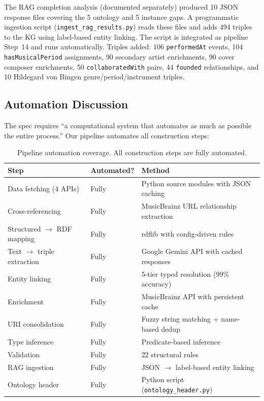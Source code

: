 \documentclass[11pt,a4paper]{article}
\begin{document}
The RAG completion analysis (documented separately) produced 10 JSON response files covering the 5 ontology and 5 instance gaps. A programmatic ingestion script (\texttt{ingest\_rag\_results.py}) reads these files and adds 494 triples to the KG using label-based entity linking. The script is integrated as pipeline Step~14 and runs automatically. Triples added: 106 \texttt{performedAt} events, 104 \texttt{hasMusicalPeriod} assignments, 90 secondary artist enrichments, 90 cover composer enrichments, 50 \texttt{collaboratedWith} pairs, 44 \texttt{founded} relationships, and 10 Hildegard von Bingen genre/period/instrument triples.

\subsection{Automation Discussion}

The spec requires ``a computational system that automates as much as possible the entire process.'' Our pipeline automates all construction steps:

\begin{table}[h]
\centering
\small
\begin{tabular}{llp{6cm}}
\toprule
\textbf{Step} & \textbf{Automated?} & \textbf{Method} \\
\midrule
Data fetching (4 APIs) & Fully & Python source modules with JSON caching \\
Cross-referencing & Fully & MusicBrainz URL relationship extraction \\
Structured $\rightarrow$ RDF mapping & Fully & rdflib with config-driven rules \\
Text $\rightarrow$ triple extraction & Fully & Google Gemini API with cached responses \\
Entity linking & Fully & 5-tier typed resolution (99\% accuracy) \\
Enrichment & Fully & MusicBrainz API with persistent cache \\
URI consolidation & Fully & Fuzzy string matching + name-based dedup \\
Type inference & Fully & Predicate-based inference \\
Validation & Fully & 22 structural rules \\
RAG ingestion & Fully & JSON $\rightarrow$ label-based entity linking \\
Ontology header & Fully & Python script (\texttt{ontology\_header.py}) \\
\bottomrule
\end{tabular}
\caption{Pipeline automation coverage. All construction steps are fully automated.}
\end{table}
\end{document}
